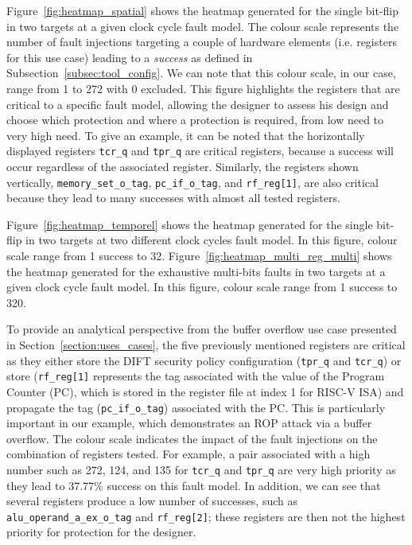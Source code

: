 Figure~\ref{fig:heatmap_spatial} shows the heatmap generated for the single bit-flip in two targets at a given clock cycle fault model.
The colour scale represents the number of fault injections targeting a couple of hardware elements (i.e. registers for this use case) leading to a \textit{success} as defined in Subsection~\ref{subsec:tool_config}. We can note that this colour scale, in our case, range from 1 to 272 with 0 excluded.
This figure highlights the registers that are critical to a specific fault model, allowing the designer to assess his design and choose which protection and where a protection is required, from low need to very high need.
To give an example, it can be noted that the horizontally displayed registers \texttt{tcr\_q} and \texttt{tpr\_q} are critical registers, because a success will occur regardless of the associated register. Similarly, the registers shown vertically, \texttt{memory\_set\_o\_tag}, \texttt{pc\_if\_o\_tag}, and \texttt{rf\_reg[1]}, are also critical because they lead to many successes with almost all tested registers.

Figure~\ref{fig:heatmap_temporel} shows the heatmap generated for the single bit-flip in two targets at two different clock cycles fault model. In this figure, colour scale range from 1 success to 32.
Figure~\ref{fig:heatmap_multi_reg_multi} shows the heatmap generated for the exhaustive multi-bits faults in two targets at a given clock cycle fault model. In this figure, colour scale range from 1 success to 320.

To provide an analytical perspective from the buffer overflow use case presented in Section~\ref{section:uses_cases}, the five previously mentioned registers are critical as they either store the DIFT security policy configuration (\texttt{tpr\_q} and \texttt{tcr\_q}) or store (\texttt{rf\_reg[1]} represents the tag associated with the value of the Program Counter (PC), which is stored in the register file at index 1 for RISC-V ISA) and propagate the tag (\texttt{pc\_if\_o\_tag}) associated with the PC. This is particularly important in our example, which demonstrates an ROP attack via a buffer overflow.
The colour scale indicates the impact of the fault injections on the combination of registers tested. For example, a pair associated with a high number such as 272, 124, and 135 for \texttt{tcr\_q} and \texttt{tpr\_q} are very high priority as they lead to 37.77\% success on this fault model.
In addition, we can see that several registers produce a low number of successes, such as \mbox{\texttt{alu\_operand\_a\_ex\_o\_tag}} and \mbox{\texttt{rf\_reg[2]}}; these registers are then not the highest priority for protection for the designer.

